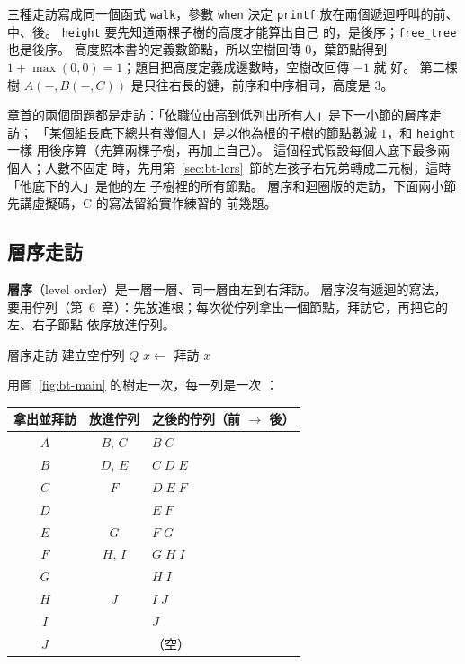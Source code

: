 三種走訪寫成同一個函式 \texttt{walk}，參數 \texttt{when} 決定 \texttt{printf}
放在兩個遞迴呼叫的前、中、後。 \texttt{height} 要先知道兩棵子樹的高度才能算出自己
的，是後序；\texttt{free\_tree} 也是後序。 高度照本書的定義數節點，所以空樹回傳
$0$，葉節點得到 $1 + \max(0, 0) = 1$；題目把高度定義成邊數時，空樹改回傳 $-1$ 就
好。 第二棵樹 $A(-, B(-, C))$ 是只往右長的鏈，前序和中序相同，高度是 $3$。

章首的兩個問題都是走訪：「依職位由高到低列出所有人」是下一小節的層序走訪；
「某個組長底下總共有幾個人」是以他為根的子樹的節點數減 $1$，和 \texttt{height} 一樣
用後序算（先算兩棵子樹，再加上自己）。 這個程式假設每個人底下最多兩個人；人數不固定
時，先用第~\ref{sec:bt-lcrs}~節的左孩子右兄弟轉成二元樹，這時「他底下的人」是他的左
子樹裡的所有節點。 層序和迴圈版的走訪，下面兩小節先講虛擬碼，C 的寫法留給實作練習的
前幾題。

\subsection{層序走訪}
\label{sec:bt-level}

\textbf{層序}（level order）是一層一層、同一層由左到右拜訪。 層序沒有遞迴的寫法，
要用佇列（第~6~章）：先放進根；每次從佇列拿出一個節點，拜訪它，再把它的左、右子節點
依序放進佇列。

\begin{pseudo}[label=alg:bt-level]{層序走訪}
        \State \Return
    \EndIf
    \State 建立空佇列 $Q$
    \State {}
        \State $x \gets$ 
        \State 拜訪 $x$
            \State {}
        \EndIf
            \State {}
        \EndIf
    \EndWhile
\EndProcedure
\end{pseudo}

用圖~\ref{fig:bt-main} 的樹走一次，每一列是一次 ：

\begin{center}
\begin{tabular}{ccl}
\toprule
拿出並拜訪 & 放進佇列 & 之後的佇列（前 $\to$ 後）\\
\midrule
$A$ & $B$, $C$ & $B\;C$ \\
$B$ & $D$, $E$ & $C\;D\;E$ \\
$C$ & $F$ & $D\;E\;F$ \\
$D$ & & $E\;F$ \\
$E$ & $G$ & $F\;G$ \\
$F$ & $H$, $I$ & $G\;H\;I$ \\
$G$ & & $H\;I$ \\
$H$ & $J$ & $I\;J$ \\
$I$ & & $J$ \\
$J$ & & （空）\\
\bottomrule
\end{tabular}
\end{center}


